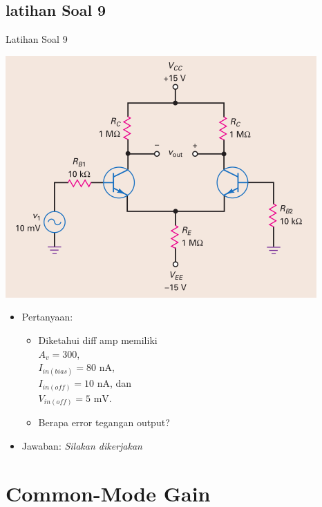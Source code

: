 \documentclass[aspectratio=169]{beamer}
\begin{document}
\subsection{latihan Soal 9}
\begin{frame}{Latihan Soal 9}
	\begin{multicols}{2}
		\begin{center}
			\includegraphics[height=0.7\textheight]{gambar/01.contoh_soal_9}
		\end{center}
		\columnbreak
		\begin{itemize}
			\item Pertanyaan:
			\begin{itemize}
				\item Diketahui diff amp memiliki\\
				$ A_v = 300 $, \\
				$ I_{in(bias)} = 80 \text{ nA}$, \\
				$ I_{in(off)} = 10 \text{ nA}$, dan \\
				$ V_{in(off)} = 5 \text{ mV}$.
				\item Berapa error tegangan output?
			\end{itemize}
			\item Jawaban: \textit{Silakan dikerjakan}
		\end{itemize}
	\end{multicols}
\end{frame}

\section{Common-Mode Gain}
\end{document}
